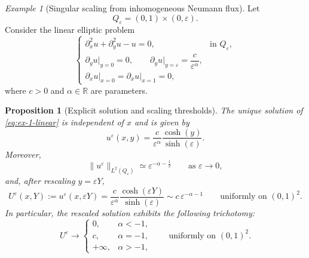 \documentclass[11pt]{article}
\newtheorem{proposition}[theorem]{Proposition}
\theoremstyle{definition}
\theoremstyle{remark}
\newtheorem{example}[theorem]{Example}
\numberwithin{equation}{section}
\newcommand{\eps}{\varepsilon}
\begin{document}
\begin{example}[Singular scaling from inhomogeneous Neumann flux]
    Let
\[
Q_\varepsilon=(0,1)\times(0,\varepsilon).
\]
Consider the linear elliptic problem
\begin{equation}\label{eq:ex-1-linear}
\begin{cases}
\partial_x^2u+\partial_y^2u-u=0, & \text{in }Q_\varepsilon,\\[0.3em]
\partial_yu\big|_{y=0}=0,\qquad \partial_yu\big|_{y=\varepsilon}=\dfrac{c}{\varepsilon^\alpha}, &\\[0.7em]
\partial_xu\big|_{x=0}=\partial_xu\big|_{x=1}=0,&
\end{cases}
\end{equation}
where $c>0$ and $\alpha\in\mathbb R$ are parameters.

\begin{proposition}[Explicit solution and scaling thresholds]\label{prop:explicit-neumann-example}
The unique solution of \eqref{eq:ex-1-linear} is independent of $x$ and is given by
\begin{equation}\label{eq:explicit-neumann-solution}
u^\varepsilon(x,y)=\frac{c}{\varepsilon^\alpha}\frac{\cosh(y)}{\sinh(\varepsilon)}.
\end{equation}
Moreover,
\begin{equation}\label{eq:explicit-neumann-l2-asymptotic}
\|u^\varepsilon\|_{L^2(Q_\varepsilon)}\simeq \varepsilon^{-\alpha-\frac12}
\qquad\text{as }\varepsilon\to0,
\end{equation}
and, after rescaling $y=\varepsilon Y$,
\begin{equation}\label{eq:explicit-neumann-rescaled-solution}
U^\varepsilon(x,Y):=u^\varepsilon(x,\varepsilon Y)
=
\frac{c}{\varepsilon^\alpha}\frac{\cosh(\varepsilon Y)}{\sinh(\varepsilon)}
\sim c\,\varepsilon^{-\alpha-1}
\qquad\text{uniformly on }(0,1)^2.
\end{equation}
In particular, the rescaled solution exhibits the following trichotomy:
\begin{equation}\label{eq:trichotomy}
U^\varepsilon\to
\begin{cases}
0, & \alpha<-1,\\
c, & \alpha=-1,\\
+\infty, & \alpha>-1,
\end{cases}
\qquad\text{uniformly on }(0,1)^2.
\end{equation}
\end{proposition}


\end{example}
\end{document}
